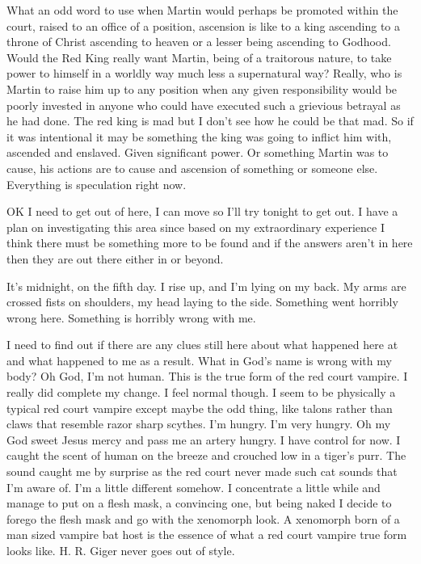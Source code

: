 What an odd word to use when Martin would perhaps be promoted within the court, raised to an office of a position, ascension is like to a king ascending to a throne of Christ ascending to heaven or a lesser being ascending to Godhood. Would the Red King really want Martin, being of a traitorous nature, to take power to himself in a worldly way much less a supernatural way? Really, who is Martin to raise him up to any position when any given responsibility would be poorly invested in anyone who could have executed such a grievious betrayal as he had done. The red king is mad but I don't see how he could be that mad. So if it was intentional it may be something the king was going to inflict him with, ascended and enslaved. Given significant power. Or something Martin was to cause, his actions are to cause and ascension of something or someone else. Everything is speculation right now.

OK I need to get out of here, I can move so I'll try tonight to get out. I have a plan on investigating this area since based on my extraordinary experience I think there must be something more to be found and if the answers aren't in here then they are out there either in \chichenitza or beyond.

It's midnight, on the fifth day. I rise up, and I'm lying on my back. My arms are crossed fists on shoulders, my head laying to the side. Something went horribly wrong here. Something is horribly wrong with me.

\parasep

I need to find out if there are any clues still here about what happened here at \chichenitza and what happened to me as a result. What in God's name is wrong with my body? Oh God, I'm not human. This is the true form of the red court vampire. I really did complete my change. I feel normal though. I seem to be physically a typical red court vampire except maybe the odd thing, like talons rather than claws that resemble razor sharp scythes. I'm hungry. I'm very hungry. Oh my God sweet Jesus mercy and pass me an artery hungry. I have control for now. I caught the scent of human on the breeze and crouched low in a tiger's purr. The sound caught me by surprise as the red court never made such cat sounds that I'm aware of. I'm a little different somehow. I concentrate a little while and manage to put on a flesh mask, a convincing one, but being naked I decide to forego the flesh mask and go with the xenomorph look. A xenomorph born of a man sized vampire bat host is the essence of what a red court vampire true form looks like. H. R. Giger never goes out of style. 

